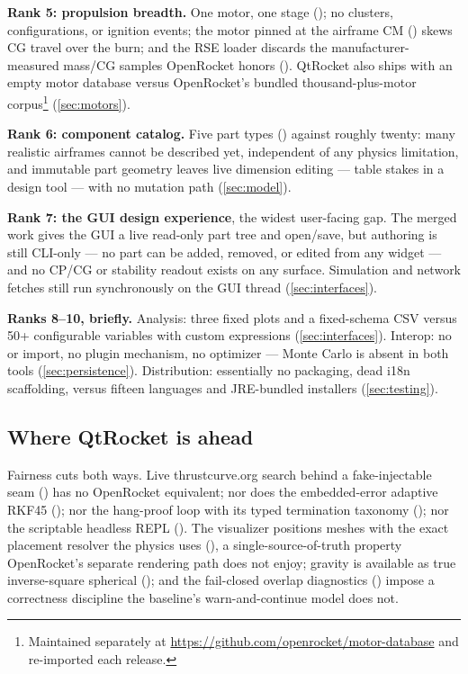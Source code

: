 \textbf{Rank 5: propulsion breadth.} One motor, one stage ();
no clusters, configurations, or ignition events; the motor pinned at the airframe CM
() skews CG travel over the burn; and the RSE loader discards
the manufacturer-measured mass/CG samples OpenRocket honors
(). QtRocket also ships with an empty motor database versus
OpenRocket's bundled thousand-plus-motor corpus\footnote{Maintained separately at
\url{https://github.com/openrocket/motor-database} and re-imported each release.}
(\cref{sec:motors}).

\textbf{Rank 6: component catalog.} Five part types ()
against roughly twenty: many realistic airframes cannot be described yet, independent of any
physics limitation, and immutable part geometry leaves live dimension editing --- table stakes in
a design tool --- with no mutation path (\cref{sec:model}).

\textbf{Rank 7: the GUI design experience}, the widest user-facing gap. The merged
 work gives the GUI a live read-only part tree and 
open/save, but authoring is still CLI-only --- no part can be added, removed, or edited from any
widget --- and no CP/CG or stability readout exists on any surface. Simulation and network fetches
still run synchronously on the GUI thread (\cref{sec:interfaces}).

\textbf{Ranks 8--10, briefly.} Analysis: three fixed plots and a fixed-schema CSV versus 50+
configurable variables with custom expressions (\cref{sec:interfaces}). Interop: no 
or  import, no plugin mechanism, no optimizer --- Monte Carlo is absent in both tools
(\cref{sec:persistence}). Distribution: essentially no packaging, dead i18n scaffolding, versus
fifteen languages and JRE-bundled installers (\cref{sec:testing}).

\subsection{Where QtRocket is ahead}\label{sec:comparison-ahead}

Fairness cuts both ways. Live thrustcurve.org search behind a fake-injectable seam
() has no OpenRocket equivalent; nor does the embedded-error
adaptive RKF45 (); nor the hang-proof loop with its typed termination
taxonomy (); nor the scriptable headless REPL
(). The visualizer positions meshes with the exact placement resolver the
physics uses (), a single-source-of-truth property
OpenRocket's separate rendering path does not enjoy; gravity is available as true inverse-square
spherical (); and the fail-closed overlap diagnostics
() impose a correctness discipline the baseline's
warn-and-continue model does not.

